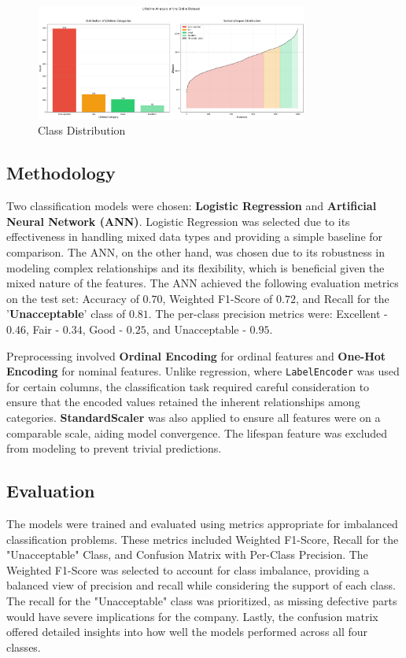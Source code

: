 \documentclass{article}
\begin{document}
\begin{figure}[htbp]
    \centering
    \includegraphics[width=0.8\textwidth]{./Images/ClassDistribution.png}
    \caption{Class Distribution}
    \label{fig:class_distribution}
\end{figure}


\subsection{Methodology}

Two classification models were chosen: \textbf{Logistic Regression} and \textbf{Artificial Neural Network (ANN)}. Logistic Regression was selected due to its effectiveness in handling mixed data types and providing a simple baseline for comparison. The ANN, on the other hand, was chosen due to its robustness in modeling complex relationships and its flexibility, which is beneficial given the mixed nature of the features. The ANN achieved the following evaluation metrics on the test set: Accuracy of $0.70$, Weighted F1-Score of $0.72$, and Recall for the '\textbf{Unacceptable}' class of $0.81$. The per-class precision metrics were: Excellent - $0.46$, Fair - $0.34$, Good - $0.25$, and Unacceptable - $0.95$.

Preprocessing involved \textbf{Ordinal Encoding} for ordinal features and \textbf{One-Hot Encoding} for nominal features. Unlike regression, where \texttt{LabelEncoder} was used for certain columns, the classification task required careful consideration to ensure that the encoded values retained the inherent relationships among categories. \textbf{StandardScaler} was also applied to ensure all features were on a comparable scale, aiding model convergence. The lifespan feature was excluded from modeling to prevent trivial predictions.

\subsection{Evaluation}

The models were trained and evaluated using metrics appropriate for imbalanced classification problems. These metrics included Weighted F1-Score, Recall for the "Unacceptable" Class, and Confusion Matrix with Per-Class Precision. The Weighted F1-Score was selected to account for class imbalance, providing a balanced view of precision and recall while considering the support of each class. The recall for the "Unacceptable" class was prioritized, as missing defective parts would have severe implications for the company. Lastly, the confusion matrix offered detailed insights into how well the models performed across all four classes.
\end{document}
